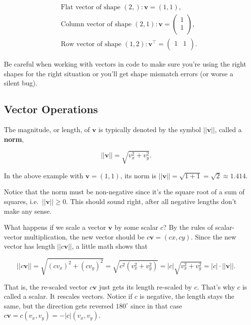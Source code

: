 \documentclass[
  letterpaper,
  DIV=11,
  numbers=noendperiod]{scrreprt}
\begin{document}
\begin{align*}
&\text{Flat vector of shape } (2,): \mathbf{v} = (1,1), \\
&\text{Column vector of shape } (2,1): \mathbf{v} = \begin{pmatrix}
1 \\
1 \\
\end{pmatrix}, \\
&\text{Row vector of shape } (1,2): \mathbf{v}^\top = \begin{pmatrix}
1 & 1 \\
\end{pmatrix}.
\end{align*}

Be careful when working with vectors in code to make sure you're using
the right shapes for the right situation or you'll get shape mismatch
errors (or worse a silent bug).

\hypertarget{vector-operations}{%
\subsection{Vector Operations}\label{vector-operations}}

The magnitude, or length, of \(\mathbf{v}\) is typically denoted by the
symbol \(||\mathbf{v}||\), called a \textbf{norm},

\[||\mathbf{v}|| = \sqrt{v_x^2 + v_y^2}.\]

In the above example with \(\mathbf{v}=(1,1)\), its norm is
\(||\mathbf{v}||=\sqrt{1+1}=\sqrt{2} \approx 1.414\).

Notice that the norm must be non-negative since it's the square root of
a sum of squares, i.e.~\(||\mathbf{v}|| \geq 0\). This should sound
right, after all negative lengths don't make any sense.

What happens if we scale a vector \(\mathbf{v}\) by some scalar \(c\)?
By the rules of scalar-vector multiplication, the new vector should be
\(c\mathbf{v}=(cx,cy)\). Since the new vector has length
\(||c\mathbf{v}||\), a little math shows that

\[||c\mathbf{v}|| = \sqrt{(cv_x)^2 + (cv_y)^2} = \sqrt{c^2(v_x^2 + v_y^2)} = |c| \sqrt{v_x^2 + v_y^2} = |c| \cdot ||\mathbf{v}||.\]

That is, the re-scaled vector \(c\mathbf{v}\) just gets its length
re-scaled by \(c\). That's why \(c\) is called a scalar. It rescales
vectors. Notice if \(c\) is negative, the length stays the same, but the
direction gets reversed \(180^\circ\) since in that case
\(c\mathbf{v} = c(v_x, v_y) = -|c|(v_x,v_y)\).
\end{document}
